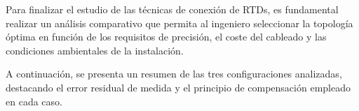 


Para finalizar el estudio de las técnicas de conexión de RTDs, es fundamental
realizar un análisis comparativo que permita al ingeniero seleccionar la
topología óptima en función de los requisitos de precisión, el coste del
cableado y las condiciones ambientales de la instalación.

A continuación, se presenta un resumen de las tres configuraciones analizadas,
destacando el error residual de medida y el principio de compensación empleado
en cada caso.

